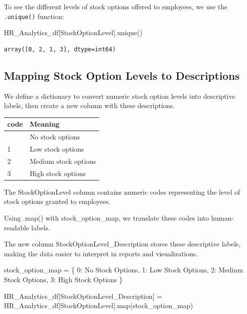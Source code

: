 \documentclass[
  letterpaper,
  DIV=11,
  numbers=noendperiod]{scrartcl}
\newenvironment{Shaded}{\begin{snugshade}}{\end{snugshade}}
\newcommand{\BuiltInTok}[1]{\textcolor[rgb]{0.00,0.23,0.31}{#1}}
\newcommand{\DecValTok}[1]{\textcolor[rgb]{0.68,0.00,0.00}{#1}}
\newcommand{\NormalTok}[1]{\textcolor[rgb]{0.00,0.23,0.31}{#1}}
\newcommand{\OperatorTok}[1]{\textcolor[rgb]{0.37,0.37,0.37}{#1}}
\newcommand{\StringTok}[1]{\textcolor[rgb]{0.13,0.47,0.30}{#1}}
\begin{document}
To see the different levels of stock options offered to employees, we
use the \texttt{.unique()} function:

\begin{Shaded}
\begin{Highlighting}[]
\NormalTok{HR\_Analytics\_df[}\StringTok{\textquotesingle{}StockOptionLevel\textquotesingle{}}\NormalTok{].unique()}
\end{Highlighting}
\end{Shaded}

\begin{verbatim}
array([0, 2, 1, 3], dtype=int64)
\end{verbatim}

\subsection{Mapping Stock Option Levels to
Descriptions}\label{mapping-stock-option-levels-to-descriptions}

We define a dictionary to convert numeric stock option levels into
descriptive labels, then create a new column with these descriptions.

\begin{longtable}[]{@{}ll@{}}
\toprule\noalign{}
code & Meaning \\
\midrule\noalign{}
\endhead
\bottomrule\noalign{}
\endlastfoot
0 & No stock options \\
1 & Low stock options \\
2 & Medium stock options \\
3 & High stock options \\
\end{longtable}

The StockOptionLevel column contains numeric codes representing the
level of stock options granted to employees.

Using .map() with stock\_option\_map, we translate these codes into
human-readable labels.

The new column StockOptionLevel\_Description stores these descriptive
labels, making the data easier to interpret in reports and
visualizations.

\begin{Shaded}
\begin{Highlighting}[]
\NormalTok{stock\_option\_map }\OperatorTok{=}\NormalTok{ \{}
    \DecValTok{0}\NormalTok{: }\StringTok{\textquotesingle{}No Stock Options\textquotesingle{}}\NormalTok{,}
    \DecValTok{1}\NormalTok{: }\StringTok{\textquotesingle{}Low Stock Options\textquotesingle{}}\NormalTok{,}
    \DecValTok{2}\NormalTok{: }\StringTok{\textquotesingle{}Medium Stock Options\textquotesingle{}}\NormalTok{,}
    \DecValTok{3}\NormalTok{: }\StringTok{\textquotesingle{}High Stock Options\textquotesingle{}}
\NormalTok{\}}

\NormalTok{HR\_Analytics\_df[}\StringTok{\textquotesingle{}StockOptionLevel\_Description\textquotesingle{}}\NormalTok{] }\OperatorTok{=}\NormalTok{ HR\_Analytics\_df[}\StringTok{\textquotesingle{}StockOptionLevel\textquotesingle{}}\NormalTok{].}\BuiltInTok{map}\NormalTok{(stock\_option\_map)}
\end{Highlighting}
\end{Shaded}
\end{document}
